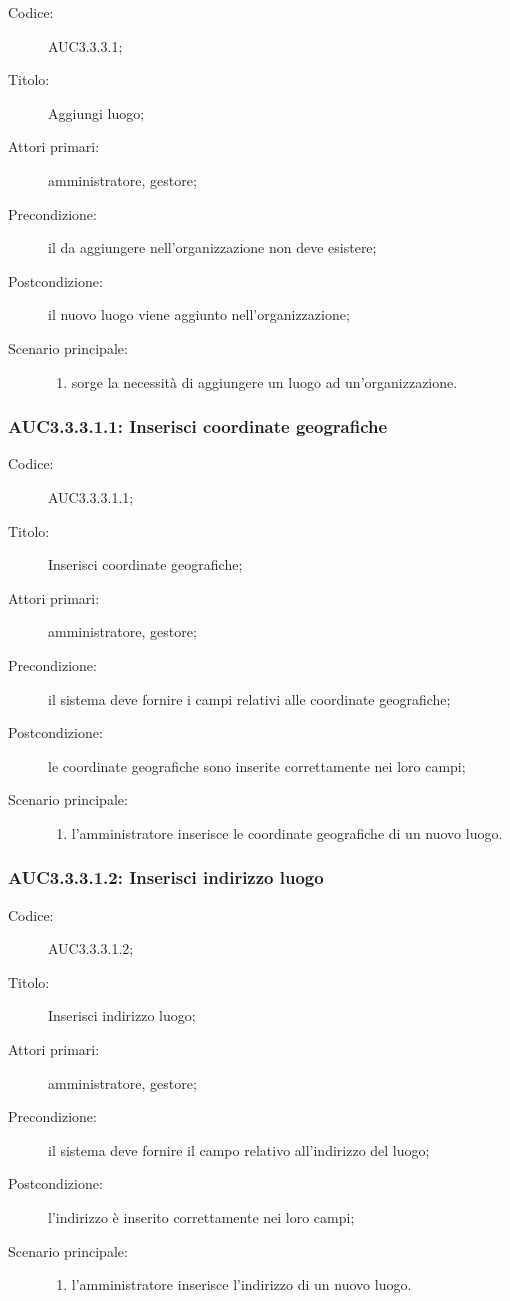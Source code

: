 \documentclass[../../../analisi-dei-requisiti.tex]{subfiles}
\begin{document}
\begin{description}
  \item[Codice:] AUC3.3.3.1;
  \item[Titolo:] Aggiungi luogo;
  \item[Attori primari:] amministratore, gestore;
  \item[Precondizione:] il  da aggiungere nell'organizzazione non deve esistere;
  \item[Postcondizione:] il nuovo luogo viene aggiunto nell'organizzazione;
  \item[Scenario principale:]
  \begin{enumerate}
    \item sorge la necessità di aggiungere un luogo ad un'organizzazione.
  \end{enumerate}
\end{description}

\subsubsection{AUC3.3.3.1.1: Inserisci coordinate geografiche}%
\label{subs:AUC3.3.3.1.1}
\begin{description}
  \item[Codice:] AUC3.3.3.1.1;
  \item[Titolo:] Inserisci coordinate geografiche;
  \item[Attori primari:] amministratore, gestore;
  \item[Precondizione:] il sistema deve fornire i campi relativi alle coordinate geografiche;
  \item[Postcondizione:] le coordinate geografiche sono inserite correttamente nei loro campi;
  \item[Scenario principale:]
  \begin{enumerate}
    \item l'amministratore inserisce le coordinate geografiche di un nuovo luogo.
  \end{enumerate}
\end{description}

\subsubsection{AUC3.3.3.1.2: Inserisci indirizzo luogo}%
\label{subs:AUC3.3.3.1.2}
\begin{description}
  \item[Codice:] AUC3.3.3.1.2;
  \item[Titolo:] Inserisci indirizzo luogo;
  \item[Attori primari:] amministratore, gestore;
  \item[Precondizione:] il sistema deve fornire il campo relativo all'indirizzo del luogo;
  \item[Postcondizione:] l'indirizzo è inserito correttamente nei loro campi;
  \item[Scenario principale:]
  \begin{enumerate}
    \item l'amministratore inserisce l'indirizzo di un nuovo luogo.
  \end{enumerate}
\end{description}
\end{document}
